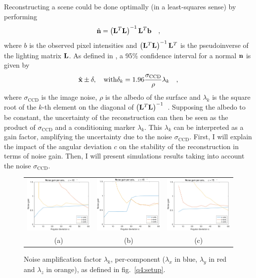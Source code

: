 \documentclass{report}
\begin{document}
Reconstructing a scene could be done optimally (in a least-squares sense) by performing
\begin{equation}
\hat{\mathbf{n}} = \left( \mathbf{L}^T\mathbf{L}\right)^{-1} \mathbf{L}^T \mathbf{b}
\quad,
\end{equation}
where $b$ is the observed pixel intensities and $\left( \mathbf{L}^T\mathbf{L}\right)^{-1} \mathbf{L}^T$ is the pseudoinverse of the lighting matrix $\mathbf{L}$.
As defined in \cite{holdgeoffroy-3dv-15}, a 95\% confidence interval for a normal $\mathbf{n}$ is given by
\begin{equation}
\hat{\mathbf{x}} \pm \mathbf{\delta} , \quad \text{with} \delta_k = 1.96\frac{\sigma_{\text{CCD}}}{\rho}\lambda_k
\quad,
\end{equation}
where $\sigma_\text{CCD}$ is the image noise, $\rho$ is the albedo of the surface and $\lambda_k$ is the square root of the $k$-th element on the diagonal of $\left(\mathbf{L}^T\mathbf{L}\right)^{-1}$~\cite{Hastie-09}.
Supposing the albedo to be constant, the uncertainty of the reconstruction can then be seen as the product of $\sigma_\text{CCD}$ and a conditioning marker $\lambda_k$. This $\lambda_k$ can be interpreted as a gain factor, amplifying the uncertainty due to the noise $\sigma_\text{CCD}$. First, I will explain the impact of the angular deviation $c$ on the stability of the reconstruction in terms of noise gain. Then, I will present simulations results taking into account the noise $\sigma_\text{CCD}$.

\begin{figure}
  \centering
  \begin{tabular}{ccc}
  \includegraphics[width=0.30\linewidth]{q4_noise_10.pdf} &
  \includegraphics[width=0.30\linewidth]{q4_noise_45.pdf} &
  \includegraphics[width=0.30\linewidth]{q4_noise_75.pdf} \\
  (a) &
  (b) &
  (c)
  \end{tabular}
  \caption[Per-component noise amplification factor]
   {Noise amplification factor $\lambda_k$, per-component ($\lambda_x$ in blue, $\lambda_y$ in red and $\lambda_z$ in orange), as defined in fig.~\ref{q4:setup}.}
  \label{q4:lambda}
\end{figure}
\end{document}
